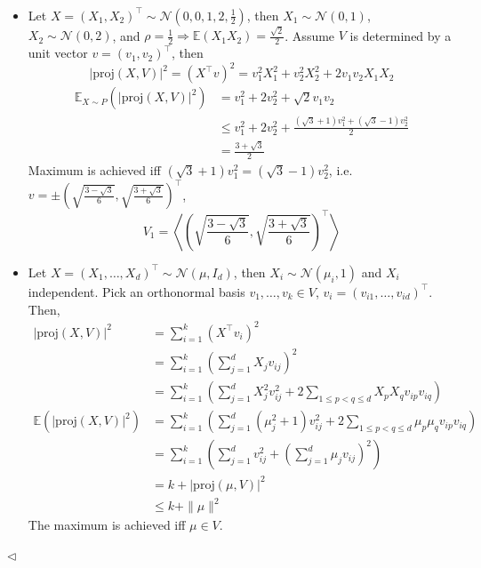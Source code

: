 \documentclass[11pt]{article}
\newenvironment{answer}[1][Answer]{\begin{trivlist}
\item[\hskip \labelsep {\bfseries #1.}\hskip \labelsep]}{\hfill$\lhd$\end{trivlist}}
\newcommand\E{\mathbb{E}}
\begin{document}
\begin{answer} ~
    \begin{itemize}
        \item[(1)] Let $X = (X_1, X_2)^\top \sim \mathcal{N}(0, 0, 1, 2, \frac{1}{2})$, then $X_1 \sim \mathcal{N}(0, 1)$, $X_2 \sim \mathcal{N}(0, 2)$, and $\rho = \frac{1}{2} \Rightarrow \E(X_1 X_2) = \frac{\sqrt{2}}{2}$. Assume $V$ is determined by a unit vector $v = (v_1, v_2)^\top$, then
        \[|\mathrm{proj}(X, V)|^2 = (X^\top v)^2 = v_1^2X_1^2 + v_2^2X_2^2 + 2v_1v_2X_1X_2\]
        \begin{align*}\E_{X\sim P}(|\mathrm{proj}(X, V)|^2) &= v_1^2 + 2v_2^2 + \sqrt{2}v_1v_2 \\ &\le v_1^2 + 2v_2^2 + \frac{(\sqrt{3} + 1)v_1^2 + (\sqrt{3} - 1)v_2^2}{2} \\ &= \frac{3 + \sqrt{3}}{2}\end{align*}
        Maximum is achieved iff $(\sqrt{3} + 1)v_1^2 = (\sqrt{3} - 1)v_2^2$, i.e. $v = \pm\left(\sqrt{\frac{3 - \sqrt{3}}{6}}, \sqrt{\frac{3 + \sqrt{3}}{6}}\right)^\top$,
        \[V_1 = \left\langle \left(\sqrt{\frac{3 - \sqrt{3}}{6}}, \sqrt{\frac{3 + \sqrt{3}}{6}}\right)^\top\right\rangle\]
        \item[(2)] Let $X = (X_1, \dots, X_d)^\top \sim \mathcal{N}(\mu, I_d)$, then $X_i \sim \mathcal{N}(\mu_i, 1)$ and $X_i$ independent. Pick an orthonormal basis $v_1, \dots, v_k \in V$, $v_i = (v_{i1}, \dots, v_{id})^\top$. Then,
        \begin{align*}
            |\mathrm{proj}(X, V)|^2 &= \sum_{i=1}^k (X^\top v_i)^2 \\
            &= \sum_{i=1}^k \left(\sum_{j=1}^d X_j v_{ij} \right)^2 \\
            &= \sum_{i=1}^k \left(\sum_{j=1}^d X_j^2 v_{ij}^2 + 2\sum_{1 \le p < q \le d} X_p X_q v_{ip} v_{iq}\right) \\
            \E(|\mathrm{proj}(X, V)|^2) &= \sum_{i=1}^k \left(\sum_{j=1}^d (\mu_j^2 + 1)v_{ij}^2 + 2\sum_{1\le p<q\le d} \mu_p\mu_q v_{ip}v_{iq}\right) \\
            &= \sum_{i=1}^k \left(\sum_{j=1}^d v_{ij}^2 + \left(\sum_{j=1}^d \mu_jv_{ij}\right)^2 \right) \\
            &= k + |\mathrm{proj}(\mu, V)|^2 \\
            &\le k + \|\mu\|^2
        \end{align*}
        The maximum is achieved iff $\mu \in V$.
    \end{itemize}
\end{answer}
\end{document}
